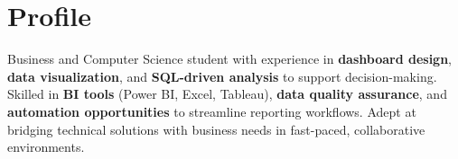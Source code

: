 \section{Profile}

\small{
Business and Computer Science student with experience in \textbf{dashboard design}, \textbf{data visualization}, and \textbf{SQL-driven analysis} to support decision-making. Skilled in \textbf{BI tools} (Power BI, Excel, Tableau), \textbf{data quality assurance}, and \textbf{automation opportunities} to streamline reporting workflows. Adept at bridging technical solutions with business needs in fast-paced, collaborative environments.}